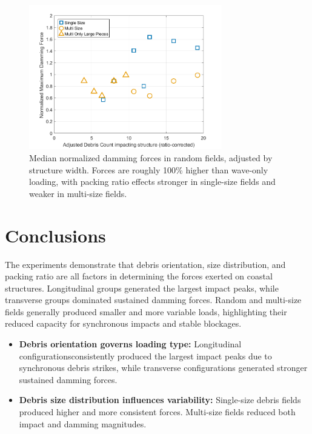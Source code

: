 \documentclass{article}
\begin{document}
{\begin{figure}[htbp]
    \centering
    \includegraphics[width=0.75\textwidth]{Damming_Median_Single_vs_Multi_Adjusted.png}
    \caption{Median normalized damming forces in random fields, adjusted by structure width. Forces are roughly 100\% higher than wave-only loading, with packing ratio effects stronger in single-size fields and weaker in multi-size fields.}
    \label{fig:random_damming_median_adjusted}
\end{figure}


\section{Conclusions} The experiments demonstrate that debris orientation, size distribution, and packing ratio are all factors in determining the forces exerted on coastal structures. Longitudinal groups generated the largest impact peaks, while transverse groups dominated sustained damming forces. Random and multi-size fields generally produced smaller and more variable loads, highlighting their reduced capacity for synchronous impacts and stable blockages. 

\begin{itemize}
    \item \textbf{Debris orientation governs loading type:} Longitudinal configurationsconsistently produced the largest impact peaks due to synchronous debris strikes, while transverse configurations generated stronger sustained damming forces.
    
    \item \textbf{Debris size distribution influences variability:} Single-size debris fields produced higher and more consistent forces. Multi-size fields reduced both impact and damming magnitudes.
    

\end{itemize}}
\end{document}
